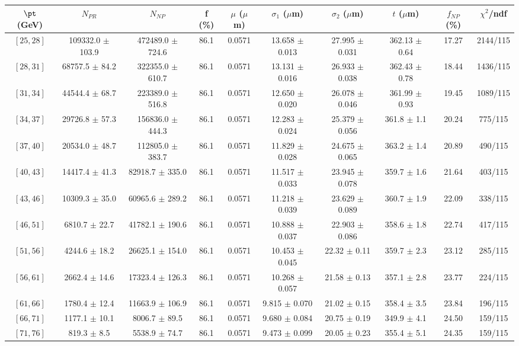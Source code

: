 \begin{tabular}{c||c|c|c|c|c|c|c||c|c}
$\pt$ (GeV) & $N_{PR}$ & $N_{NP}$ & f (\%) & $\mu$ ($\mu$m) & $\sigma_1$ ($\mu$m) & $\sigma_2$ ($\mu$m)  & $t$ ($\mu$m) & $f_{NP}$ (\%) & $\chi^2$/ndf \\
\hline
$[25, 28]$ & 109332.0 $\pm$ 103.9 & 472489.0 $\pm$ 724.6 & 86.1 & 0.0571 & 13.658 $\pm$ 0.013 & 27.995 $\pm$ 0.031 & 362.13 $\pm$ 0.64 & 17.27 & 2144/115\\
$[28, 31]$ & 68757.5 $\pm$ 84.2 & 322355.0 $\pm$ 610.7 & 86.1 & 0.0571 & 13.131 $\pm$ 0.016 & 26.933 $\pm$ 0.038 & 362.43 $\pm$ 0.78 & 18.44 & 1436/115\\
$[31, 34]$ & 44544.4 $\pm$ 68.7 & 223389.0 $\pm$ 516.8 & 86.1 & 0.0571 & 12.650 $\pm$ 0.020 & 26.078 $\pm$ 0.046 & 361.99 $\pm$ 0.93 & 19.45 & 1089/115\\
$[34, 37]$ & 29726.8 $\pm$ 57.3 & 156836.0 $\pm$ 444.3 & 86.1 & 0.0571 & 12.283 $\pm$ 0.024 & 25.379 $\pm$ 0.056 & 361.8 $\pm$ 1.1 & 20.24 & 775/115\\
$[37, 40]$ & 20534.0 $\pm$ 48.7 & 112805.0 $\pm$ 383.7 & 86.1 & 0.0571 & 11.829 $\pm$ 0.028 & 24.675 $\pm$ 0.065 & 363.2 $\pm$ 1.4 & 20.89 & 490/115\\
$[40, 43]$ & 14417.4 $\pm$ 41.3 & 82918.7 $\pm$ 335.0 & 86.1 & 0.0571 & 11.517 $\pm$ 0.033 & 23.945 $\pm$ 0.078 & 359.7 $\pm$ 1.6 & 21.64 & 403/115\\
$[43, 46]$ & 10309.3 $\pm$ 35.0 & 60965.6 $\pm$ 289.2 & 86.1 & 0.0571 & 11.218 $\pm$ 0.039 & 23.629 $\pm$ 0.089 & 360.7 $\pm$ 1.9 & 22.09 & 338/115\\
$[46, 51]$ & 6810.7 $\pm$ 22.7 & 41782.1 $\pm$ 190.6 & 86.1 & 0.0571 & 10.888 $\pm$ 0.037 & 22.903 $\pm$ 0.086 & 358.6 $\pm$ 1.8 & 22.74 & 417/115\\
$[51, 56]$ & 4244.6 $\pm$ 18.2 & 26625.1 $\pm$ 154.0 & 86.1 & 0.0571 & 10.453 $\pm$ 0.045 & 22.32 $\pm$ 0.11 & 359.7 $\pm$ 2.3 & 23.12 & 285/115\\
$[56, 61]$ & 2662.4 $\pm$ 14.6 & 17323.4 $\pm$ 126.3 & 86.1 & 0.0571 & 10.268 $\pm$ 0.057 & 21.58 $\pm$ 0.13 & 357.1 $\pm$ 2.8 & 23.77 & 224/115\\
$[61, 66]$ & 1780.4 $\pm$ 12.4 & 11663.9 $\pm$ 106.9 & 86.1 & 0.0571 & 9.815 $\pm$ 0.070 & 21.02 $\pm$ 0.15 & 358.4 $\pm$ 3.5 & 23.84 & 196/115\\
$[66, 71]$ & 1177.1 $\pm$ 10.1 & 8006.7 $\pm$ 89.5 & 86.1 & 0.0571 & 9.680 $\pm$ 0.084 & 20.75 $\pm$ 0.19 & 349.9 $\pm$ 4.1 & 24.50 & 159/115\\
$[71, 76]$ & 819.3 $\pm$ 8.5 & 5538.9 $\pm$ 74.7 & 86.1 & 0.0571 & 9.473 $\pm$ 0.099 & 20.05 $\pm$ 0.23 & 355.4 $\pm$ 5.1 & 24.35 & 159/115\\

\end{tabular}
